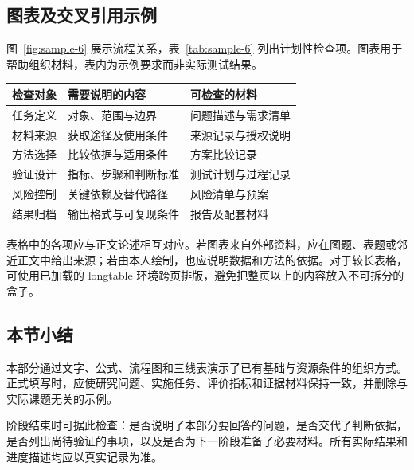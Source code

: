 \subsection{图表及交叉引用示例}
图~\ref{fig:sample-6} 展示流程关系，表~\ref{tab:sample-6} 列出计划性检查项。图表用于帮助组织材料，表内为示例要求而非实际测试结果。
\begin{center}
\begin{minipage}{\linewidth}\centering
{}
\label{fig:sample-6}
\end{minipage}\end{center}
\begin{center}\begin{minipage}{\linewidth}\centering
{}\label{tab:sample-6}
\begin{tabularx}{\linewidth}{p{23mm}XX}
\toprule
检查对象 & 需要说明的内容 & 可检查的材料\\
\midrule
任务定义 & 对象、范围与边界 & 问题描述与需求清单\\
材料来源 & 获取途径及使用条件 & 来源记录与授权说明\\
方法选择 & 比较依据与适用条件 & 方案比较记录\\
验证设计 & 指标、步骤和判断标准 & 测试计划与过程记录\\
风险控制 & 关键依赖及替代路径 & 风险清单与预案\\
结果归档 & 输出格式与可复现条件 & 报告及配套材料\\
\bottomrule
\end{tabularx}
\end{minipage}\end{center}
表格中的各项应与正文论述相互对应。若图表来自外部资料，应在图题、表题或邻近正文中给出来源；若由本人绘制，也应说明数据和方法的依据。对于较长表格，可使用已加载的 longtable 环境跨页排版，避免把整页以上的内容放入不可拆分的盒子。

\subsection{本节小结}
本部分通过文字、公式、流程图和三线表演示了已有基础与资源条件的组织方式。正式填写时，应使研究问题、实施任务、评价指标和证据材料保持一致，并删除与实际课题无关的示例。

阶段结束时可据此检查：是否说明了本部分要回答的问题，是否交代了判断依据，是否列出尚待验证的事项，以及是否为下一阶段准备了必要材料。所有实际结果和进度描述均应以真实记录为准。
